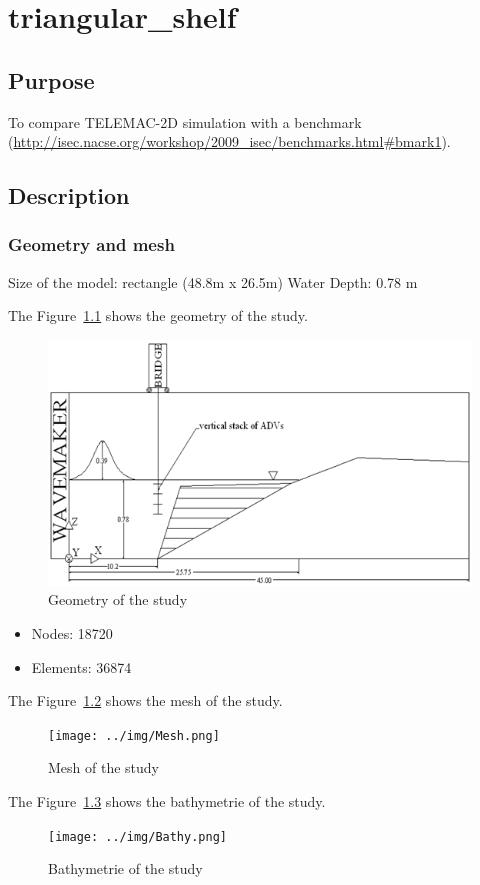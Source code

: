 \chapter{triangular\_shelf}

\section{Purpose}

To compare TELEMAC-2D simulation with a benchmark
(\url{http://isec.nacse.org/workshop/2009_isec/benchmarks.html#bmark1}).

\section{Description}

\subsection{Geometry and mesh}

Size of the model: rectangle (48.8m x 26.5m)
Water Depth: 0.78 m

The Figure~\ref{fig:triang:geometry} shows the geometry of the study.
\begin{figure}
\centering
\includegraphics[width=.6\textwidth]{img/geom.png}
\caption{Geometry of the study}\label{fig:triang:geometry}
\end{figure}

\begin{itemize}
  \item Nodes: 18720
  \item Elements: 36874
\end{itemize}

The Figure~\ref{fig:triang:mesh} shows the mesh of the study.
\begin{figure}
\centering
\texttt{[image: ../img/Mesh.png]}
\caption{Mesh of the study}\label{fig:triang:mesh}
\end{figure}


The Figure~\ref{fig:triang:bathy} shows the bathymetrie of the study.
\begin{figure}
\centering
\texttt{[image: ../img/Bathy.png]}
\caption{Bathymetrie of the study}\label{fig:triang:bathy}
\end{figure}



